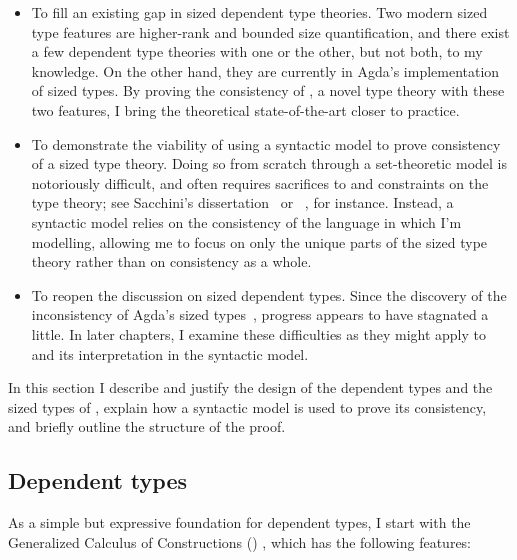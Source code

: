 \begin{itemize}
  \item To fill an existing gap in sized dependent type theories.
    Two modern sized type features are higher-rank and bounded size quantification,
    and there exist a few dependent type theories with one or the other,
    but not both, to my knowledge.
    On the other hand, they are currently in Agda's implementation of sized types.
    By proving the consistency of \lang, a novel type theory with these two features,
    I bring the theoretical state-of-the-art closer to practice. \\
  \item To demonstrate the viability of using a syntactic model to prove consistency
    of a sized type theory.
    Doing so from scratch through a set-theoretic model is notoriously difficult,
    and often requires sacrifices to and constraints on the type theory;
    see Sacchini's dissertation~\citep{CIC-hat-minus} or \CIChatstar~\citep{CIC-hat-star},
    for instance.
    Instead, a syntactic model relies on the consistency of the language in which I'm modelling,
    allowing me to focus on only the unique parts of the sized type theory
    rather than on consistency as a whole.
  \item To reopen the discussion on sized dependent types.
    Since the discovery of the inconsistency of Agda's sized types~\citep{infinity},
    progress appears to have stagnated a little.
    In later chapters, I examine these difficulties as they might apply to \lang
    and its interpretation in the syntactic model.
\end{itemize}

In this section I describe and justify the design of
the dependent types and the sized types of \lang,
explain how a syntactic model is used to prove its consistency,
and briefly outline the structure of the proof.

\subsection{Dependent types}

As a simple but expressive foundation for dependent types,
I start with the Generalized Calculus of Constructions (\GCC) \citep{GCC-Coquand},
which has the following features:

